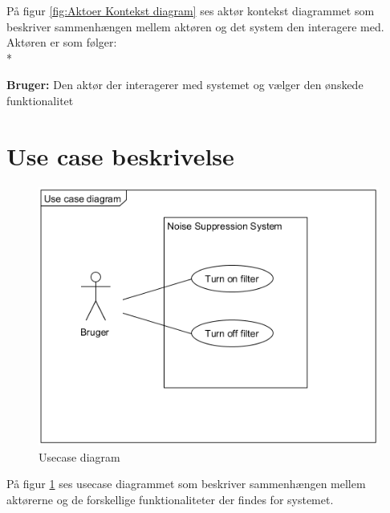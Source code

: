 På figur \ref{fig:Aktoer Kontekst diagram} ses aktør kontekst diagrammet som beskriver sammenhængen mellem aktøren og det system den interagere med. Aktøren er som følger: \\*

\textbf{Bruger:} Den aktør der interagerer med systemet og vælger den ønskede funktionalitet \\


\section{Use case beskrivelse}

\begin{figure}[H]
	\centering
	\includegraphics[width = 300 pt]{Img/Usecase_Diagram.png}
	\caption{Usecase diagram}
	\label{fig:Usecase diagram}
\end{figure}

På figur \ref{fig:Usecase diagram} ses usecase diagrammet som beskriver sammenhængen mellem aktørerne og de forskellige funktionaliteter der findes for systemet.

